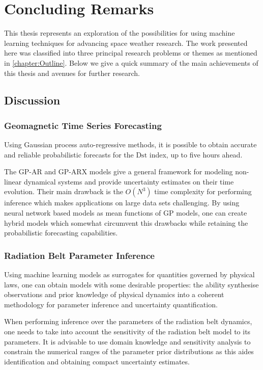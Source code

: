 \chapter{Concluding Remarks}\label{chapter:conclusions}

This thesis represents an exploration of the possibilities for using machine learning techniques 
for advancing space weather research. The work presented here was classified into three principal 
research problems or themes as mentioned in \cref{chapter:Outline}. Below we give a quick summary 
of the main achievements of this thesis and avenues for further research.

\section{Discussion}

\subsection*{Geomagnetic Time Series Forecasting}

Using Gaussian process auto-regressive methods, it is possible to obtain accurate and reliable 
probabilistic forecasts for the $\mathrm{Dst}$ index, up to five hours ahead. 

The GP-AR and GP-ARX models give a general framework for modeling non-linear dynamical systems and 
provide uncertainty estimates on their time evolution. Their main drawback is the $O(N^3)$ time 
complexity for performing inference which makes applications on large data sets challenging. By 
using neural network based models as mean functions of GP models, one can create hybrid models 
which somewhat circumvent this drawbacks while retaining the probabilistic forecasting 
capabilities.

\subsection*{Radiation Belt Parameter Inference}

Using machine learning models as surrogates for quantities governed by physical laws, one can 
obtain models with some desirable properties: the ability synthesise observations and prior 
knowledge of physical dynamics into a coherent methodology for parameter inference and uncertainty 
quantification. 

When performing inference over the parameters of the radiation belt dynamics, one needs to take 
into account the sensitivity of the radiation belt model to its parameters. It is advisable to use 
domain knowledge and sensitivity analysis to constrain the numerical ranges of the parameter 
prior distributions as this aides identification and obtaining compact uncertainty estimates.

